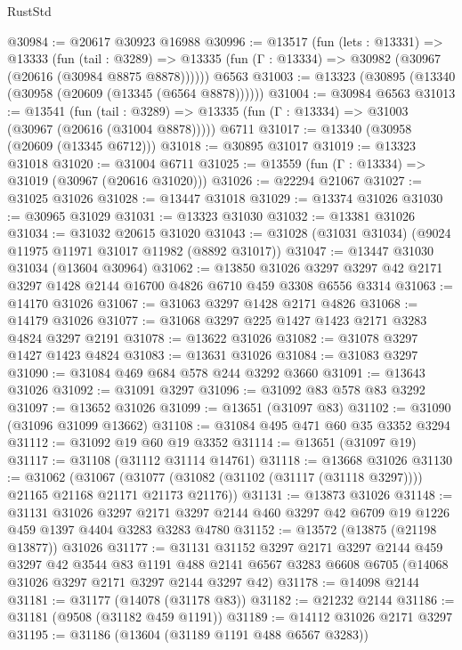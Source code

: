 \begin{lexlean}{RustStd}
\begin{coremodule}
@30984 := @20617 @30923 @16988
@30996 := @13517
    (fun (lets : @13331) =>
    @13333
      (fun (tail : @3289) =>
      @13335 (fun (Γ : @13334) => @30982 (@30967 (@20616 (@30984 @8875 @8878))))))
    @6563
@31003 := @13323 (@30895 (@13340 (@30958 (@20609 (@13345 (@6564 @8878))))))
@31004 := @30984 @6563
@31013 := @13541
    (fun (tail : @3289) => @13335 (fun (Γ : @13334) => @31003 (@30967 (@20616 (@31004 @8878)))))
    @6711
@31017 := @13340 (@30958 (@20609 (@13345 @6712)))
@31018 := @30895 @31017
@31019 := @13323 @31018
@31020 := @31004 @6711
@31025 := @13559 (fun (Γ : @13334) => @31019 (@30967 (@20616 @31020)))
@31026 := @22294 @21067
@31027 := @31025 @31026
@31028 := @13447 @31018
@31029 := @13374 @31026
@31030 := @30965 @31029
@31031 := @13323 @31030
@31032 := @13381 @31026
@31034 := @31032 @20615 @31020
@31043 := @31028 (@31031 @31034) (@9024 @11975 @11971 @31017 @11982 (@8892 @31017))
@31047 := @13447 @31030 @31034 (@13604 @30964)
@31062 := @13850
    @31026
    @3297
    @3297
    @42
    @2171
    @3297
    @1428
    @2144
    @16700
    @4826
    @6710
    @459
    @3308
    @6556
    @3314
@31063 := @14170 @31026
@31067 := @31063 @3297 @1428 @2171 @4826
@31068 := @14179 @31026
@31077 := @31068 @3297 @225 @1427 @1423 @2171 @3283 @4824 @3297 @2191
@31078 := @13622 @31026
@31082 := @31078 @3297 @1427 @1423 @4824
@31083 := @13631 @31026
@31084 := @31083 @3297
@31090 := @31084 @469 @684 @578 @244 @3292 @3660
@31091 := @13643 @31026
@31092 := @31091 @3297
@31096 := @31092 @83 @578 @83 @3292
@31097 := @13652 @31026
@31099 := @13651 (@31097 @83)
@31102 := @31090 (@31096 @31099 @13662)
@31108 := @31084 @495 @471 @60 @35 @3352 @3294
@31112 := @31092 @19 @60 @19 @3352
@31114 := @13651 (@31097 @19)
@31117 := @31108 (@31112 @31114 @14761)
@31118 := @13668 @31026
@31130 := @31062
    (@31067 (@31077 (@31082 (@31102 (@31117 (@31118 @3297)))) @21165 @21168 @21171 @21173 @21176))
@31131 := @13873 @31026
@31148 := @31131
    @31026
    @3297
    @2171
    @3297
    @2144
    @460
    @3297
    @42
    @6709
    @19
    @1226
    @459
    @1397
    @4404
    @3283
    @3283
    @4780
@31152 := @13572 (@13875 (@21198 @13877)) @31026
@31177 := @31131
    @31152
    @3297
    @2171
    @3297
    @2144
    @459
    @3297
    @42
    @3544
    @83
    @1191
    @488
    @2141
    @6567
    @3283
    @6608
    @6705
    (@14068 @31026 @3297 @2171 @3297 @2144 @3297 @42)
@31178 := @14098 @2144
@31181 := @31177 (@14078 (@31178 @83))
@31182 := @21232 @2144
@31186 := @31181 (@9508 (@31182 @459 @1191))
@31189 := @14112 @31026 @2171 @3297
@31195 := @31186 (@13604 (@31189 @1191 @488 @6567 @3283))

\end{coremodule}
\end{lexlean}
